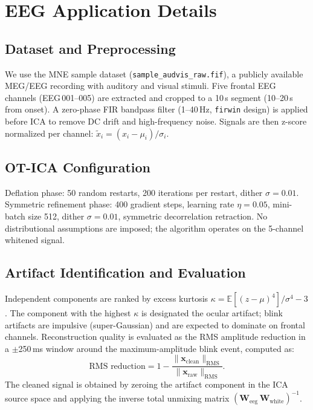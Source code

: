 \documentclass{tpm2026} %
\begin{document}
\section{EEG Application Details}
\label{app:eeg}

\subsection{Dataset and Preprocessing}
We use the MNE sample dataset (\texttt{sample\_audvis\_raw.fif}), a publicly available MEG/EEG recording with auditory and visual stimuli.
Five frontal EEG channels (EEG\,001--005) are extracted and cropped to a 10\,s segment (10--20\,s from onset).
A zero-phase FIR bandpass filter (1--40\,Hz, \texttt{firwin} design) is applied before ICA to remove DC drift and high-frequency noise.
Signals are then z-score normalized per channel: $\tilde{x}_i = (x_i - \mu_i)/\sigma_i$.

\subsection{OT-ICA Configuration}
Deflation phase: 50 random restarts, 200 iterations per restart, dither $\sigma = 0.01$.
Symmetric refinement phase: 400 gradient steps, learning rate $\eta = 0.05$, mini-batch size 512, dither $\sigma = 0.01$, symmetric decorrelation retraction.
No distributional assumptions are imposed; the algorithm operates on the 5-channel whitened signal.

\subsection{Artifact Identification and Evaluation}
Independent components are ranked by excess kurtosis $\kappa = \mathbb{E}[(z - \mu)^4]/\sigma^4 - 3$.
The component with the highest $\kappa$ is designated the ocular artifact; blink artifacts are impulsive (super-Gaussian) and are expected to dominate on frontal channels.
Reconstruction quality is evaluated as the RMS amplitude reduction in a $\pm$250\,ms window around the maximum-amplitude blink event, computed as:
\begin{equation}
    \text{RMS reduction} = 1 - \frac{\|\mathbf{x}_{\text{clean}}\|_{\text{RMS}}}{\|\mathbf{x}_{\text{raw}}\|_{\text{RMS}}}.
\end{equation}
The cleaned signal is obtained by zeroing the artifact component in the ICA source space and applying the inverse total unmixing matrix $(\mathbf{W}_{\text{eeg}} \, \mathbf{W}_{\text{white}})^{-1}$.
\end{document}
